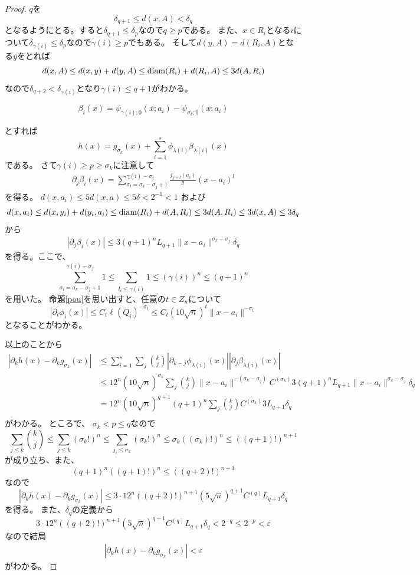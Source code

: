 \documentclass[leqno]{jsarticle}
\newcommand{\ep}{\varepsilon}
\newcommand{\di}{\text{{\rm diam}}}
\begin{document}
\begin{proof}
$q$を
\[
\delta_{q+1}\le d(x, A)< \delta_{q}
\]
となるようにとる。すると$\delta_{q+1}\le \delta_p$なので$q\ge p$である。
また、$x\in R_i$となる$i$について$\delta_{\gamma(i)}\le \delta_p$なので$\gamma(i)\ge p$でもある。
そして$d(y,A)=d(R_i,A)$となる$y$をとれば
\[
d(x,A)\le d(x,y)+d(y,A)\le \di(R_i)+d(R_i, A)\le 3d(A,R_i)
\]
なので$\delta_{q+2}<\delta_{\gamma(i)}$となり$\gamma(i)\le q+1$がわかる。

\[
\beta_i(x)=\psi_{\gamma(i);0}(x;a_i)-\psi_{\sigma_k;0}(x;a_i)
\]

とすれば
\[
h(x)=g_{\sigma_k}(x)+\sum_{i=1}^s\phi_{\lambda(i)}\beta_{\lambda(i)}(x)
\]
である。
さて$\gamma(i)\ge p\ge \sigma_k$に注意して
\begin{align}
\partial_j\beta_{i}(x)=\sum_{\sigma_l=\sigma_k-\sigma_j+1}^{\gamma(i)-\sigma_j}\frac{f_{j+l}(a_i)}{l!}(x-a_i)^{l}
\end{align}
を得る。
$d(x,a_i)\le 5d(x,a)\le 5\delta<2^{-1}<1$
および
\[
d(x,a_i)\le d(x,y_i)+d(y_i,a_i)\le \di(R_i)+d(A,R_i)\le 3d(A,R_i)\le 3d(x,A)\le 3\delta_q
\]
から
\begin{align}
|\partial_j\beta_{i}(x)|\le 3(q+1)^nL_{q+1}\|x-a_i\|^{\sigma_k-\sigma_j}\delta_q
\end{align}
を得る。ここで、
\[
\sum_{\sigma_l=\sigma_k-\sigma_j+1}^{\gamma(i)-\sigma_j}1\le 
\sum_{l_i\le \gamma(i)}1\le (\gamma(i))^n\le (q+1)^n
\]
を用いた。
命題\ref{pou}を思い出すと、任意の$t\in Z_n$について
\[
|\partial_t\phi_i(x)|\le C_t\ell(Q_i)^{-\sigma_t}\le C_t(10\sqrt{n})^t\|x-a_i\|^{-\sigma_t}
\]
となることがわかる。

以上のことから
\begin{align*}
|\partial_kh(x)-\partial_kg_{\sigma_k}(x)|&\le 
\sum_{i=1}^s\sum_{j}\binom{k}{j}|\partial_{k-j}\phi_{\lambda(i)}(x)||\partial_{j}\beta_{\lambda(i)}(x)|\\
&\le 12^n (10\sqrt{n})^{\sigma_k}\sum_j\binom{k}{j}\|x-a_i\|^{-(\sigma_k-\sigma_j)}C^{(\sigma_k)}3(q+1)^nL_{q+1}\|x-a_i\|^{\sigma_k-\sigma_j}\delta_q\\
&=12^n (10\sqrt{n})^{q+1}(q+1)^n\sum_j\binom{k}{j}C^{(\sigma_k)}3L_{q+1}\delta_q\\
\end{align*}
がわかる。
ところで、
$\sigma_k<p\le q$なので
\[
\sum_{j\le k}\binom{k}{j}\le\sum_{j\le k}(\sigma_k!)^n
\le \sum_{j_i\le \sigma_k}(\sigma_k!)^n\le \sigma_k((\sigma_k)!)^{n}\le ((q+1)!)^{n+1}
\]
が成り立ち、また、
\[
(q+1)^n((q+1)!)^n\le ((q+2)!)^{n+1}
\]
なので
\[
|\partial_kh(x)-\partial_kg_{\sigma_k}(x)|\le 3\cdot12^n((q+2)!)^{n+1}(5\sqrt{n})^{q+1}C^{(q)} L_{q+1}\delta_q
\]
を得る。
また、$\delta_q$の定義から
\[
3\cdot12^n((q+2)!)^{n+1}(5\sqrt{n})^{q+1}C^{(q)} L_{q+1}\delta_q<2^{-q}\le 2^{-p}<\ep
\]
なので結局
\begin{align}
|\partial_kh(x)-\partial_kg_{\sigma_k}(x)|<\ep
\end{align}
がわかる。
\end{proof}
\end{document}
